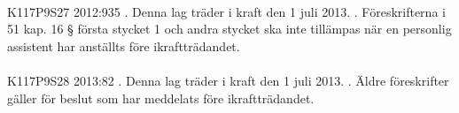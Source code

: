 \documentclass[a4paper,notitlepage,openany,10pt]{book}
\begin{document}
\paragraph*{}
{\tiny K117P9S27}
2012:935
. Denna lag träder i kraft den 1 juli 2013.
. Föreskrifterna i 51 kap. 16 § första stycket 1 och andra stycket ska inte tillämpas när en personlig assistent har anställts före ikraftträdandet.
\paragraph*{}
{\tiny K117P9S28}
2013:82
. Denna lag träder i kraft den 1 juli 2013.
. Äldre föreskrifter gäller för beslut som har meddelats före ikraftträdandet.
\end{document}
